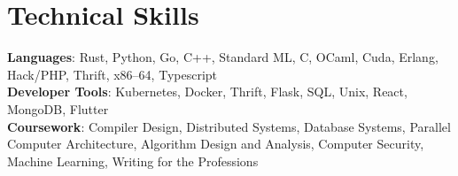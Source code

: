 \documentclass[letterpaper,11pt]{article}
\begin{document}
%
\section{Technical Skills}
 \begin{itemize}[leftmargin=0.15in, label={}]
    \small{\item{
     \textbf{Languages}{: Rust, Python, Go, C++, Standard ML, C, OCaml, Cuda, Erlang, Hack/PHP, Thrift, x86–64, Typescript} \\
     \textbf{Developer Tools}{: Kubernetes, Docker, Thrift, Flask, SQL, Unix, React, MongoDB, Flutter} \\
     \textbf{Coursework}{: Compiler Design, Distributed Systems, Database Systems, Parallel Computer Architecture, Algorithm Design and Analysis, Computer Security, Machine Learning, Writing for the Professions}
    }}
 \end{itemize}


\end{document}

